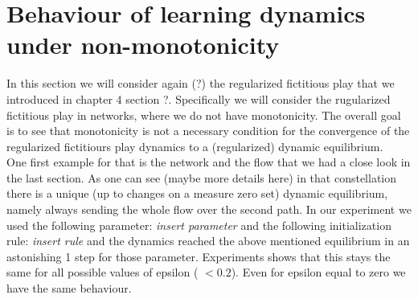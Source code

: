 \documentclass[reqno,openany]{amsbook}
\theoremstyle{definition}
\theoremstyle{plain}
\begin{document}
\section{Behaviour of learning dynamics under non-monotonicity}
In this section we will consider again (?) the regularized fictitious play that we introduced in chapter 4 section ?. Specifically we will consider the rugularized fictitious play in networks, where we do not have monotonicity. The overall goal is to see that monotonicity is not a necessary condition for the convergence of the regularized fictitiours play dynamics to a (regularized) dynamic equilibrium.\\
One first example for that is the network and the flow that we had a close look in the last section. As one can see (maybe more details here) in that constellation there is a unique (up to changes on a measure zero set) dynamic equilibrium, namely always sending the whole flow over the second path. In our experiment we used the following parameter: \emph{insert parameter} and the following initialization rule: \emph{insert rule} and the dynamics reached the above mentioned equilibrium in an astonishing 1 step for those parameter. Experiments shows that this stays the same for all possible values of epsilon ( $<0.2$). Even for epsilon equal to zero we have the same behaviour.
\end{document}
